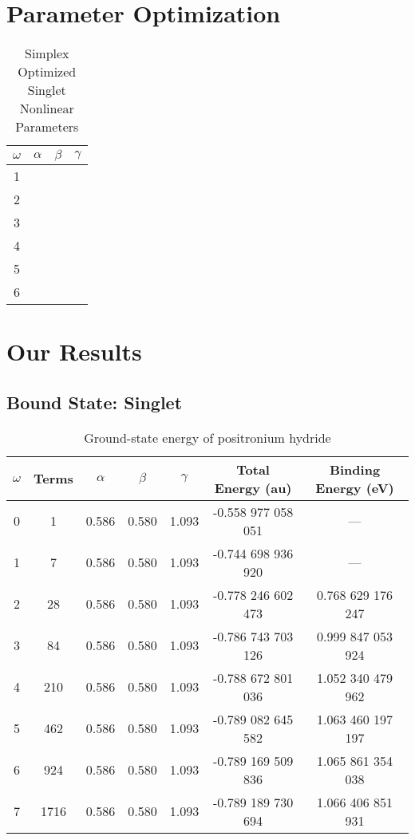 \documentclass[Dissertation.tex]{subfiles}
\begin{document}
\section{Parameter Optimization}
\label{sec:BoundOptimization}


\setlength{\abovecaptionskip}{6pt}   %
\setlength{\belowcaptionskip}{6pt}   %
\begin{table}[ht]
\caption{Simplex Optimized Singlet Nonlinear Parameters} %
\centering
\begin{tabular}{c c c c}
\hline\hline
$\omega$ & $\alpha$ & $\beta$ & $\gamma$ \\ [0.5ex]
\hline
1 &  &  &  \\
2 &  &  &  \\
3 &  &  &  \\
4 &  &  &  \\
5 &  &  &  \\
6 &  &  &  \\
\hline\hline
\end{tabular}
\label{table:NonlinearOptimized1SBroyden}
\end{table}


\section{Our Results}
\label{sec:BoundResults}

\subsection{Bound State: Singlet}

\setlength{\abovecaptionskip}{6pt}   %
\setlength{\belowcaptionskip}{6pt}   %
\begin{table}[H]
\centering
\begin{tabular}{c c c c c c c}
\toprule
$\omega$ & Terms & $\alpha$ & $\beta$ & $\gamma$ & Total Energy (au) & Binding Energy (eV) \\ [0.5ex]
\midrule
0 & 1 & 0.586 & 0.580 & 1.093 & -0.558 977 058 051 & --- \\
1 & 7 & 0.586 & 0.580 & 1.093 & -0.744 698 936 920 & --- \\
2 & 28 & 0.586 & 0.580 & 1.093 & -0.778 246 602 473 & 0.768 629 176 247 \\
3 & 84 & 0.586 & 0.580 & 1.093 & -0.786 743 703 126 & 0.999 847 053 924 \\
4 & 210 & 0.586 & 0.580 & 1.093 & -0.788 672 801 036 & 1.052 340 479 962 \\
5 & 462 & 0.586 & 0.580 & 1.093 & -0.789 082 645 582 & 1.063 460 197 197 \\
6 & 924 & 0.586 & 0.580 & 1.093 & -0.789 169 509 836 & 1.065 861 354 038 \\
7 & 1716 & 0.586 & 0.580 & 1.093 & -0.789 189 730 694 & 1.066 406 851 931 \\
\bottomrule
\end{tabular}
\caption{Ground-state energy of positronium hydride} %
\label{tab:BoundEnergy1}
\end{table}
\end{document}
